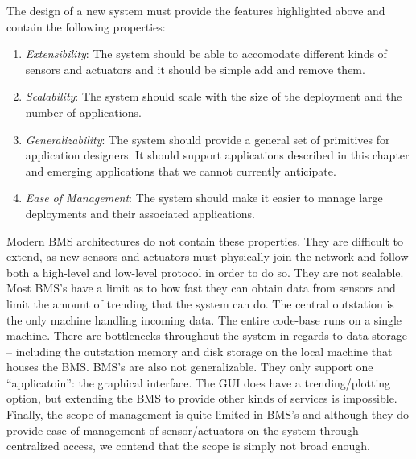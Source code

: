 
The design of a new system must provide the features highlighted above and contain the following properties:

\begin{enumerate}

\item \emph{Extensibility}:  The system should be able to accomodate different kinds of sensors and actuators and it should
be simple add and remove them.

\item \emph{Scalability}:  The system should scale with the size of the deployment and the number of applications.%

\item \emph{Generalizability}:  The system should provide a general set of primitives for application designers.  It should support applications
described in this chapter and emerging applications that we cannot currently anticipate.

\item \emph{Ease of Management}: The system should make it easier to manage large deployments and their associated applications.

\end{enumerate}

Modern BMS architectures do not contain these properties.  They are difficult to extend, as new sensors and actuators must physically join 
the network and follow both a high-level and low-level protocol in order to do so.  They are not scalable.  Most BMS's have a limit as to
how fast they can obtain data from sensors and limit the amount of trending that the system can do.  The central outstation is the only
machine handling incoming data.  The entire code-base runs on a single machine.  There are bottlenecks throughout the system in regards to
data storage -- including the outstation memory and disk storage on the local machine that houses the BMS.  BMS's are also not generalizable.
They only support one ``applicatoin'': the graphical interface.  The GUI does have a trending/plotting option, but extending the BMS
to provide other kinds of services is impossible.  Finally, the scope of management is quite limited in BMS's and although they do provide
ease of management of sensor/actuators on the system through centralized access, we contend that the scope is simply not broad enough.

